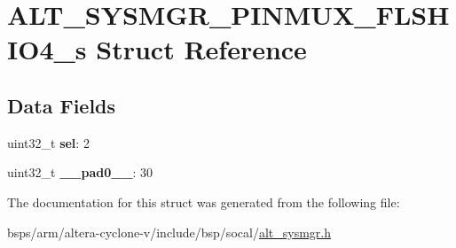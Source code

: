 \hypertarget{structALT__SYSMGR__PINMUX__FLSHIO4__s}{}\section{A\+L\+T\+\_\+\+S\+Y\+S\+M\+G\+R\+\_\+\+P\+I\+N\+M\+U\+X\+\_\+\+F\+L\+S\+H\+I\+O4\+\_\+s Struct Reference}
\label{structALT__SYSMGR__PINMUX__FLSHIO4__s}
\subsection*{Data Fields}
\begin{DoxyCompactItemize}
\item 
\mbox{\label{structALT__SYSMGR__PINMUX__FLSHIO4__s_a3423dcf49ca7abd2887b51d602cd5a50}} 
uint32\+\_\+t {\bfseries sel}\+: 2
\item 
\mbox{\label{structALT__SYSMGR__PINMUX__FLSHIO4__s_af3dca8c25ed588626440dce8deb96f26}} 
uint32\+\_\+t {\bfseries \+\_\+\+\_\+pad0\+\_\+\+\_\+}\+: 30
\end{DoxyCompactItemize}


The documentation for this struct was generated from the following file\+:\begin{DoxyCompactItemize}
\item 
bsps/arm/altera-\/cyclone-\/v/include/bsp/socal/\mbox{\hyperlink{alt__sysmgr_8h}{alt\+\_\+sysmgr.\+h}}\end{DoxyCompactItemize}
